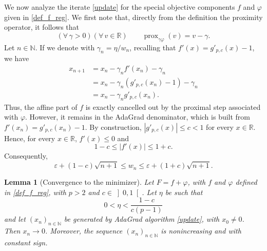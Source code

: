 \documentclass[11pt]{article}
\newtheorem{lemma}{Lemma}
\newcommand{\R}{\mathbb{R}}
\newcommand{\N}{\mathbb{N}}
\newcommand{\prox}{\operatorname{prox}}
\begin{document}
We now analyze the iterate \eqref{update} for the special objective components $f$ and $\varphi$ given in \eqref{def_f_reg}.
We first note that, directly from the definition the proximity operator, it follows that
\begin{equation*}
(\forall\,\gamma>0)(\forall\,v\in \R)\qquad \prox_{\gamma\varphi}(v)=v-\gamma.
\end{equation*}
\noindent
Let $n\in \N$.
If we denote with $\gamma_n = \eta/w_n$, recalling that $f'(x)=g'_{p,c}(x)-1$, we have
\[
\begin{aligned}
    x_{n+1}
    &=
    x_n-\gamma_n f'(x_n)-\gamma_n  \\
    &=
    x_n-\gamma_n(g'_{p,c}(x_n)-1)-\gamma_n \\
    &=
    x_n-\gamma_ng'_{p,c}(x_n).
\end{aligned}
\]
Thus, the affine part of \(f\) is exactly cancelled out by the proximal step associated with \(\varphi\). However, it remains in the AdaGrad denominator, which is built from \(f'(x_n)=g'_{p,c}(x_n)-1\).
By construction, \(|g'_{p,c}(x)|\le c<1\) for every \(x\in\R\). Hence, for every $x\in \R$, $f'(x)\leq 0$ and
\[
    1-c
    \le
    |f'(x)|
    \le
    1+c.
\]
Consequently,
\[
    \varepsilon+(1-c)\sqrt{n+1}
    \le
    w_n
    \le
    \varepsilon+(1+c)\sqrt{n+1}.
\]

\begin{lemma}[Convergence to the minimizer]
\label{lem:conv-zero}
Let $F=f+\varphi$, with $f$ and $\varphi$ defined in \eqref{def_f_reg}, with $p>2$ and $c\in \left]0,1\right[$.
Let $\eta$ be such that
\begin{equation*}
    0<\eta< \frac{1-c}{c(p-1)}
\end{equation*}
and let $(x_n)_{n\in \N}$ be generated by AdaGrad algorithm \eqref{update}, with $x_0\neq 0$.
Then \(x_n\to0\). Moreover, the sequence $(x_n)_{n\in \N}$ is nonincreasing and with constant sign.
\end{lemma}
\end{document}

